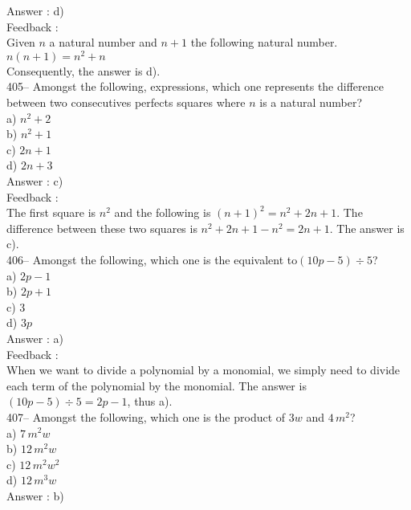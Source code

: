 \documentclass[letterpaper, 12pt]{article}
\begin{document}
Answer : d)\\

Feedback : \\
Given $n$ a natural number and $n+1$ the following natural number.\\
$n\left( n+1\right)=n^{2}+n$ \\
Consequently, the answer is d).\\

405-- Amongst the following, expressions, which one represents the difference between two consecutives perfects squares where $n$ is a natural number?\\
a) $n^{2}+2$\\
b) $n^{2}+1$\\
c) $2n+1$\\
d) $2n+3$\\

Answer : c)\\

Feedback : \\
The first square is $n^{2}$ and the following is $\left( n+1\right)
^{2}=n^{2}+2n+1$.  The difference between these two squares is $n^{2}+2n+1-n^{2}=2n+1$. The answer is c).\\

406--  Amongst the following, which one is the equivalent to$\left(
10p-5\right) \div 5$?\\
a) $2p-1$\\
b) $2p+1$\\
c) 3\\
d) $3p$\\

Answer : a)\\

Feedback : \\
When we want to divide a polynomial by a monomial, we simply need to divide each term of the polynomial by the monomial. The answer is $\left(
10p-5\right) \div 5=2p-1$, thus a).\\



407-- Amongst the following, which one is the product of $3w$ and
$4\,m^{2}$?\\
a) $7\,m^{2}w$\\
b) $12\,m^{2}w$ \\
c) $12\,m^{2}w^{2}$\\
d) $12\,m^{3}w$\\

Answer : b)\\
\end{document}
